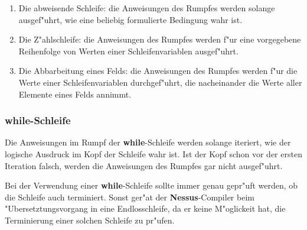\begin{enumerate}
  \item Die abweisende Schleife: die Anweisungen des Rumpfes werden solange
	ausgef"uhrt, wie eine beliebig formulierte Bedingung wahr ist.
  \item Die Z"ahlschleife: die Anweisungen des Rumpfes werden f"ur eine vorgegebene Reihenfolge von
	Werten einer Schleifenvariablen ausgef"uhrt.
  \item Die Abbarbeitung eines Felds: die Anweisungen des Rumpfes werden f"ur die Werte einer
	Schleifenvariablen durchgef"uhrt, die nacheinander die Werte aller Elemente eines Felds
	annimmt. 
\end{enumerate}


\subsubsection{{\bf while}-Schleife}
\label{whileloop}

\begin{center}
\end{center}

Die Anweisungen im Rumpf der {\bf while}-Schleife werden solange
iteriert, wie der logische Ausdruck im Kopf der Schleife wahr ist. Ist
der Kopf schon vor der ersten Iteration 
 falsch, werden die Anweisungen des
Rumpfes gar nicht ausgef"uhrt.

Bei der Verwendung einer {\bf while}-Schleife sollte
immer genau gepr"uft werden, ob die Schleife auch terminiert. Sonst
ger"at der {\bf Nessus}-Compiler beim
"Ubersetztungsvorgang in eine Endlosschleife, da er keine M"oglickeit
hat, die Terminierung einer solchen Schleife zu
pr"ufen.


